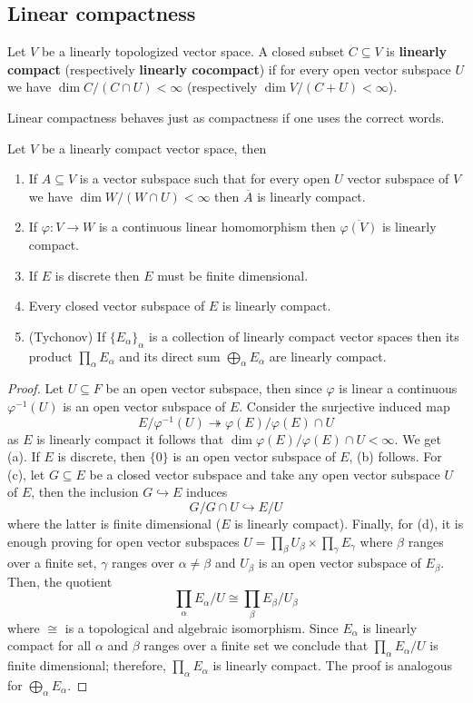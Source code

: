 \subsection*{Linear compactness}
\begin{definition}\label{linear_compactness}
	Let $V$ be a linearly topologized vector space. A closed subset $C \subseteq V$ is \textbf{linearly compact} (respectively \textbf{linearly cocompact}) if for every open vector subspace $U$ we have $\dim C/(C \cap U) < \infty$ (respectively $\dim V/(C+U) < \infty$). 
\end{definition}
Linear compactness behaves just as compactness if one uses the correct words.
\begin{proposition}\label{linear_compactness_properties}
	Let $V$ be a linearly compact vector space, then
	\begin{enumerate}[label = (\alph*)]
		\item If $A \subseteq V$ is a vector subspace such that for every open $U$ vector subspace of $V$ we have $\dim W/(W \cap U) < \infty$ then $\overline{A}$ is linearly compact.
		\item If $\varphi\colon V \to W$ is a continuous linear homomorphism then $\overline{\varphi(V)}$ is linearly compact.
		\item If $E$ is discrete then $E$ must be finite dimensional.
		\item Every closed vector subspace of $E$ is linearly compact.
		\item (Tychonov) If $\{E_{\alpha}\}_{\alpha}$ is a collection of linearly compact vector spaces then its product $\prod_{\alpha} E_{\alpha}$ and its direct sum $\bigoplus_{\alpha}E_{\alpha}$ are linearly compact.
	\end{enumerate}
\end{proposition}
\begin{proof}
	Let $U \subseteq F$ be an open vector subspace, then since $\varphi$ is linear a continuous $\varphi^{-1}(U)$ is an open vector subspace of $E$. Consider the surjective induced map 
	\[
		E/\varphi^{-1}(U) \twoheadrightarrow \varphi(E)/\varphi(E)\cap U
	\]
	as $E$ is linearly compact it follows that $\dim \varphi(E)/\varphi(E)\cap U < \infty$. We get (a). If $E$ is discrete, then $\{0\}$ is an open vector subspace of $E$, (b) follows. For (c), let $G \subseteq E$ be a closed vector subspace and take any open vector subspace $U$ of $E$, then the inclusion $G \hookrightarrow E$ induces
	\[
		G/G \cap U \hookrightarrow E/U
	\]
	where the latter is finite dimensional ($E$ is linearly compact). Finally, for (d), it is enough proving for open vector subspaces $U = \prod_{\beta} U_{\beta} \times \prod_{\gamma} E_{\gamma}$ where $\beta$ ranges over a finite set, $\gamma$ ranges over $\alpha \neq \beta$ and $U_{\beta}$ is an open vector subspace of $E_{\beta}$. Then, the quotient
	\[
		\prod_{\alpha}E_{\alpha} / U \cong \prod_{\beta} E_{\beta}/U_{\beta}
	\]
	where $\cong$ is a topological and algebraic isomorphism. Since $E_{\alpha}$ is linearly compact for all $\alpha$ and $\beta$ ranges over a finite set we conclude that $\prod_{\alpha} E_{\alpha} / U$ is finite dimensional; therefore, $\prod_{\alpha} E_{\alpha}$ is linearly compact. The proof is analogous for $\bigoplus_{\alpha} E_{\alpha}$.
\end{proof}
